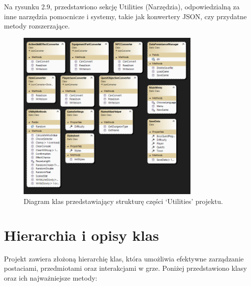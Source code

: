\begin{itemize}
    \begin{minipage}{\linewidth}%
    \item Na rysunku 2.9, przedstawiono sekcję Utilities (Narzędzia), odpowiedzialną za inne narzędzia pomocnicze i systemy, takie jak konwertery JSON, czy przydatne metody rozszerzające.
        \begin{figure}[H]
        \centering
        \includegraphics[width=0.8\textwidth]{figures/class_diagram_utilities.png}
        \caption{Diagram klas przedstawiający strukturę części `Utilities' projektu.}
        \label{fig:class_diagram_utilities}
        \end{figure}
    \end{minipage}
\end{itemize}


\section{Hierarchia i opisy klas}
Projekt zawiera złożoną hierarchię klas, która umożliwia efektywne zarządzanie postaciami, 
przedmiotami oraz interakcjami w grze. Poniżej przedstawiono klasy oraz ich najważniejsze metody:


